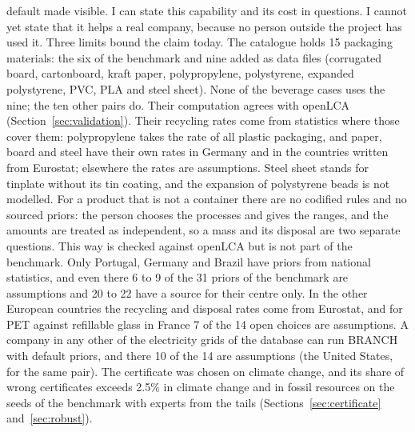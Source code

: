 \documentclass{article}
\begin{document}
default made visible. I can state this capability and its cost in questions. I cannot yet state that it
helps a real company, because no person outside the project has used it. Three limits bound the claim today.
The catalogue holds 15 packaging materials: the six of the benchmark and nine added as data files
(corrugated board, cartonboard, kraft paper, polypropylene, polystyrene, expanded polystyrene, PVC, PLA and steel sheet).
None of the \nCases{} beverage cases uses the nine; the ten other pairs do. Their computation agrees with openLCA (Section~\ref{sec:validation}). Their recycling rates
come from statistics where those cover them: polypropylene takes the rate of all plastic packaging, and paper, board and steel have
their own rates in Germany and in the countries written from Eurostat; elsewhere the rates are assumptions. Steel sheet stands for tinplate without its tin coating, and the expansion of
polystyrene beads is not modelled. For a product that is not a container there are no codified rules and no sourced priors:
the person chooses the processes and gives the ranges, and the amounts are treated as independent, so a mass and its
disposal are two separate questions. This way is checked against openLCA but is not part of the benchmark. Only Portugal, Germany and Brazil have priors from national statistics,
and even there 6 to 9 of the 31 priors of the benchmark are assumptions and 20 to 22 have a source for their centre only. In the other
European countries the recycling and disposal rates come from Eurostat, and for PET against refillable glass in France 7 of the 14
open choices are assumptions. A company in any other of the \nGrids{} electricity grids of the database can run BRANCH with
default priors, and there 10 of the 14 are assumptions (the United States, for the same pair). The certificate was chosen on climate change, and its share of wrong certificates exceeds 2.5\% in climate change and in fossil resources on the seeds of the benchmark
with experts from the tails (Sections~\ref{sec:certificate} and~\ref{sec:robust}).
\end{document}
